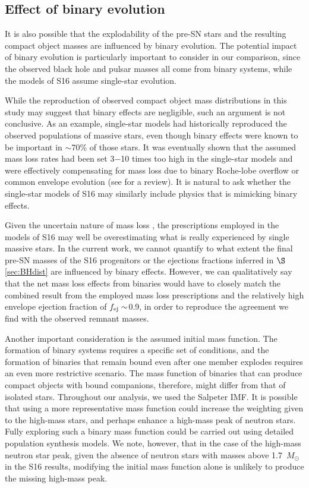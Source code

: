\documentclass[]{emulateapj}
\newcommand{\Ms}{M_{\odot}}
\newcommand{\fe}{f_{\rm ej}}
\begin{document}
\subsection{Effect of binary evolution}
\label{sec:binary}
It is also possible that the explodability of the pre-SN stars and the resulting compact object masses are influenced by binary evolution. The potential impact of binary evolution is particularly important to consider in our comparison, since the observed black hole and pulsar masses all come from binary systems, while the models of S16 assume single-star evolution. 

While the reproduction of observed compact object mass distributions in this study may suggest that binary effects are negligible, such an argument is not conclusive. As an example, single-star models had historically reproduced the observed populations of massive stars, even though binary effects were known to be important in $\sim$70\% of those stars. It was eventually shown that the assumed mass loss rates had been set 3$-$10 times too high in the single-star models and were effectively compensating for mass loss due to binary Roche-lobe overflow or common envelope evolution (see \citealt{Smith2014} for a review). It is natural to ask whether the single-star models of S16 may similarly include physics that is mimicking binary effects.

Given the uncertain nature of mass loss \citep[e.g.,][]{Renzo2017}, the prescriptions employed in the models of S16 may well be overestimating what is really experienced by single massive stars. In the current work, we cannot quantify to what extent the final pre-SN masses of the S16 progenitors or the ejections fractions inferred in $\S$\ref{sec:BHdist} are influenced by binary effects. However, we can qualitatively say that the net mass loss effects from binaries would have to closely match the combined result from the employed mass loss prescriptions \citep{Nieuwenhuijzen1990,Wellstein1999} and the relatively high envelope ejection fraction of $\fe\sim$0.9, in order to reproduce the agreement we find with the observed remnant masses. 

Another important consideration is the assumed initial mass function. The formation of binary systems requires a specific set of conditions, and the formation of binaries that remain bound even after one member explodes requires an even more restrictive scenario. The mass function of binaries that can produce compact objects with bound companions, therefore, might differ from that of isolated stars. Throughout our analysis, we used the Salpeter IMF. It is possible that using a more representative mass function could increase the weighting given to the high-mass stars, and perhaps enhance a high-mass peak of neutron stars. Fully exploring such a binary mass function could be carried out using detailed population synthesis models. We note, however, that in the case of the high-mass neutron star peak, given the absence of neutron stars with masses above 1.7~$\Ms$ in the S16 results, modifying the initial mass function alone is unlikely to produce the missing high-mass peak.
\end{document}
